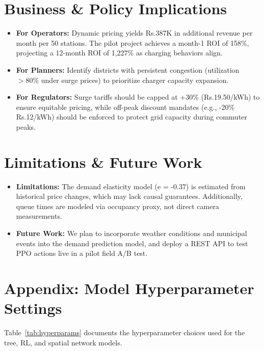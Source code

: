 \documentclass[11pt,a4paper]{article}
\begin{document}
\section{Business \& Policy Implications}
\begin{itemize}
    \item \textbf{For Operators:} Dynamic pricing yields Rs.387K in additional revenue per month per 50 stations. The pilot project achieves a month-1 ROI of 158\%, projecting a 12-month ROI of 1,227\% as charging behaviors align.
    \item \textbf{For Planners:} Identify districts with persistent congestion (utilization $>80\%$ under surge prices) to prioritize charger capacity expansion.
    \item \textbf{For Regulators:} Surge tariffs should be capped at +30\% (Rs.19.50/kWh) to ensure equitable pricing, while off-peak discount mandates (e.g., -20\% Rs.12/kWh) should be enforced to protect grid capacity during commuter peaks.
\end{itemize}

\section{Limitations \& Future Work}
\begin{itemize}
    \item \textbf{Limitations:} The demand elasticity model (e = -0.37) is estimated from historical price changes, which may lack causal guarantees. Additionally, queue times are modeled via occupancy proxy, not direct camera measurements.
    \item \textbf{Future Work:} We plan to incorporate weather conditions and municipal events into the demand prediction model, and deploy a REST API to test PPO actions live in a pilot field A/B test.
\end{itemize}

\newpage
\appendix
\section{Appendix: Model Hyperparameter Settings}
Table~\ref{tab:hyperparams} documents the hyperparameter choices used for the tree, RL, and spatial network models.
\end{document}
